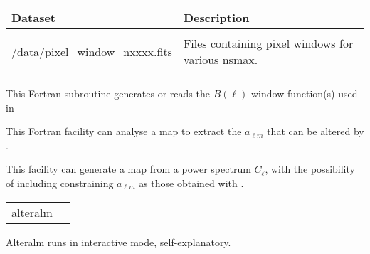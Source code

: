 \begin{datasets}
{
\begin{tabular}{p{0.3\hsize} p{0.35\hsize}} \hline  
  \textbf{Dataset} & \textbf{Description} \\ \hline
                   &                      \\ %
  /data/pixel\_window\_nxxxx.fits & Files containing pixel windows for
                   various nsmax.\\ 
                   &                      \\ \hline %
\end{tabular}
} 
\end{datasets}

\begin{support}
  \begin{sulist}{} %
  \item[\htmlref{generate\_beam}{sub:generate_beam}] This \healpix Fortran
subroutine generates or reads the $B(\ell)$ window function(s) used in \thedocid
  \item[\htmlref{anafast}{fac:anafast}] This \healpix Fortran facility can
     	       analyse a \healpix map to extract the $a_{\ell m}$ that can be
     	       altered by \thedocid.
  \item[\htmlref{synfast}{fac:synfast}] This \healpix facility can generate a
  \healpix map from a power spectrum $C_\ell$, with the possibility of including
  constraining $a_{\ell m}$ as those obtained with \thedocid.
		
  \end{sulist}
\end{support}

\begin{examples}{1}
{
\begin{tabular}{ll} %
alteralm  \\
\end{tabular}
}
{
Alteralm runs in interactive mode, self-explanatory.
}
\end{examples}


